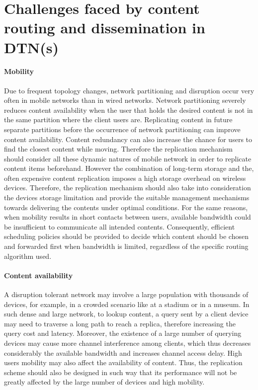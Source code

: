 \section{Challenges faced by content routing and dissemination in DTN(s)}

\paragraph{Mobility}

Due to frequent topology changes, network partitioning and disruption occur very often in mobile networks than in wired networks.
Network partitioning severely reduces content availability when the user that holds the desired content is not in the same partition where the client users are. Replicating content
in future separate partitions before the occurrence of network partitioning can improve content availability. Content redundancy can also increase the chance for users to find the
closest content while moving. Therefore the replication mechanism should consider all these dynamic natures of mobile network in order to replicate content items beforehand. However the combination of long-term storage and the, often expensive content replication imposes a high storage overhead on wireless devices. Therefore, the replication mechanism should also take into consideration the devices storage limitation and provide the suitable management mechanisms towards delivering the contents under optimal conditions. For the same reasons, when mobility results in short contacts between users, available bandwidth could be insufficient to communicate all intended contents. Consequently, efficient scheduling policies should be provided to decide which content should be chosen and forwarded first when bandwidth is limited, regardless of the specific routing algorithm used.

\paragraph{Content availability}

A disruption tolerant network may involve a large population with thousands of devices, for example, in a crowded scenario like at a stadium or in a museum. In such dense and
large network, to lookup content, a query sent by a client device may need to traverse a long path to reach a replica, therefore increasing the query cost and latency. Moreover, the
existence of a large number of querying devices may cause more channel interference among clients, which thus decreases considerably the available bandwidth and increases channel
access delay. High users mobility may also affect the availability of content. Thus, the replication scheme should also be designed in such way that its performance will not be greatly affected by the large number of devices and high mobility.

